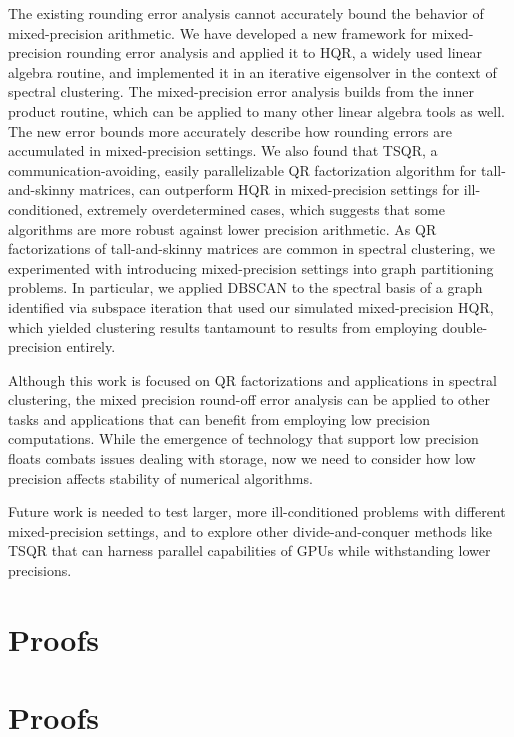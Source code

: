 \documentclass[review,onefignum,onetabnum]{siamart190516}
\begin{document}
The existing rounding error analysis cannot accurately bound the behavior of mixed-precision arithmetic.
We have developed a new framework for mixed-precision rounding error analysis and applied it to HQR, a widely used linear algebra routine, and implemented it in an iterative eigensolver in the context of spectral clustering. 
The mixed-precision error analysis builds from the inner product routine, which can be applied to many other linear algebra tools as well.
The new error bounds more accurately describe how rounding errors are accumulated in mixed-precision settings.
We also found that TSQR, a communication-avoiding, easily parallelizable QR factorization algorithm for tall-and-skinny matrices, can outperform HQR in mixed-precision settings for ill-conditioned, extremely overdetermined cases, which suggests that some algorithms are more robust against lower precision arithmetic.
As QR factorizations of tall-and-skinny matrices are common in spectral clustering, we experimented with introducing mixed-precision settings into graph partitioning problems.
In particular, we applied DBSCAN to the spectral basis of a graph identified via subspace iteration that used our simulated mixed-precision HQR, which yielded clustering results tantamount to results from employing double-precision entirely.\par

Although this work is focused on QR factorizations and applications in spectral clustering, the mixed precision round-off error analysis can be applied to other tasks and applications that can benefit from employing low precision computations. 
While the emergence of technology that support low precision floats combats issues dealing with storage, now we need to consider how low precision affects stability of numerical algorithms. 

Future work is needed to test larger, more ill-conditioned problems with different mixed-precision settings, and to explore other divide-and-conquer methods like TSQR that can harness parallel capabilities of GPUs while withstanding lower precisions. 

\appendix
\section{Proofs}
\section{Proofs}\label{appendix:A}
\end{document}
